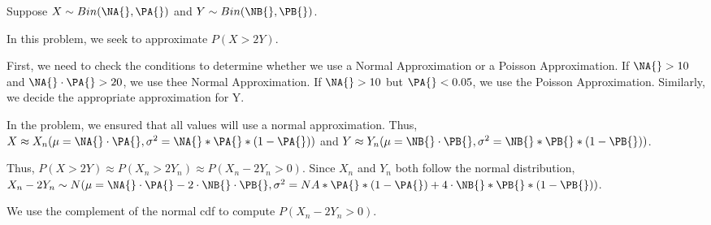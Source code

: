 Suppose $X \sim Bin(\NA{}, \PA{})$ and $Y \sim Bin(\NB{}, \PB{})$. 

In this problem, we seek to approximate $P(X > 2Y)$.

First, we need to check the conditions to determine whether we use a Normal Approximation or a Poisson Approximation. If $\NA{} > 10$ and $\NA{} \cdot \PA{} > 20$, we use thee Normal Approximation. If $\NA{} > 10$ but $\PA{} < 0.05$, we use the Poisson Approximation. Similarly, we decide the appropriate approximation for Y. 

In the problem, we ensured that all values will use a normal approximation. Thus, $X \approx X_n(\mu =\NA{} \cdot \PA{}, \sigma^2 = \NA{}* \PA{} *(1-\PA{}) )$ and $Y \approx Y_n(\mu =\NB{} \cdot \PB{}, \sigma^2 = \NB{}* \PB{} *(1-\PB{}) )$.

Thus, $P (X > 2Y) \approx P( X_n > 2 Y_n) \approx P(X_n - 2 Y_n > 0)$. Since $X_n$ and $Y_n$ both follow the normal distribution, $X_n - 2Y_n \sim N(\mu = \NA{} \cdot \PA{} - 2\cdot \NB{} \cdot \PB{}, \sigma^2 = NA{}* \PA{} *(1-\PA{})  + 4 \cdot \NB{}* \PB{} *(1-\PB{}) )$.

We use the complement of the normal cdf to compute $P(X_n - 2Y_n > 0)$.

